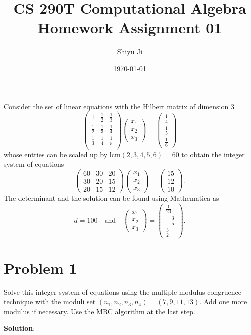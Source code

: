 \documentclass[12pt]{article}
\theoremstyle{plain}
\begin{document}
\title{CS 290T Computational Algebra Homework Assignment 01}
\author{Shiyu Ji}
\date{\today}
\maketitle

\newcommand{\m}[1]{\begin{pmatrix}#1\end{pmatrix}}
\newcommand{\rank}[1]{\operatorname{rank}(#1)}

Consider the set of linear equations with the Hilbert matrix of dimension 3
$$\m{1 & \frac{1}{2} & \frac{1}{3} \\
\frac{1}{2} & \frac{1}{3} & \frac{1}{4} \\
\frac{1}{3} & \frac{1}{4} & \frac{1}{5} \\}
\m{x_1 \\ x_2 \\ x_3}=
\m{\frac{1}{4} \\ \frac{1}{5} \\ \frac{1}{6}}$$
whose entries can be scaled up by $\mathrm{lcm}(2,3,4,5,6) = 60$ to obtain the integer system of equations
$$\m{60 & 30 & 20 \\
30 & 20 & 15 \\
20 & 15 & 12}
\m{x_1 \\ x_2 \\ x_3}=
\m{15 \\ 12 \\ 10}.$$
The determinant and the solution can be found using Mathematica as
$$d=100 \quad \mathrm{and}\quad 
\m{x_1 \\ x_2 \\ x_3}=
\m{\frac{1}{20} \\ -\frac{3}{5} \\ \frac{3}{2}}.$$

\section{Problem 1}
Solve this integer system of equations using the multiple-modulus congruence technique with the moduli set $(n_1, n_2, n_3, n_4) = (7, 9, 11, 13)$. Add one more modulus if necessary. Use the MRC algorithm at the
last step.

{\bf Solution}:
\end{document}
